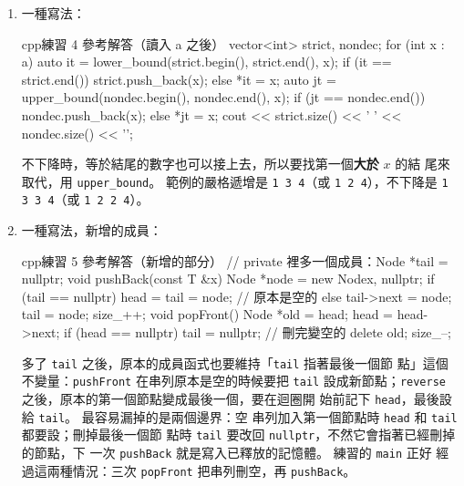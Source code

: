 \begin{enumerate}
\begin{code}{cpp}{練習 3 參考解答}
int main() {
    int n, cap;
    cin >> n >> cap;
    vector<long long> dp(cap + 1, 0);
    for (int i = 0; i < n; i++) {
        int w;
        long long v;
        cin >> w >> v;
        for (int j = cap; j >= w; j--) {   // 由大到小
            dp[j] = max(dp[j], dp[j - w] + v);
        }
    }
    cout << dp[cap] << '\n';
    return 0;
}
\end{code}
處理第 $i$ 件物品時，\texttt{dp[j]} 有兩種選擇：不拿，維持原值；拿，就是
\texttt{dp[j - w] + v}。 \texttt{j} 一定要由大到小：這樣讀到的
\texttt{dp[j - w]} 還是「沒考慮第 $i$ 件」時的值，每件只會被拿一次。 寫成
由小到大，\texttt{dp[j - w]} 可能已經拿過這件物品，同一件會被拿好幾次，範
例會輸出 \texttt{10}（重量 $2$ 的物品拿兩次再加重量 $3$ 的）。 時間是
$O(nW) = 10^7$。
\item 一種寫法：
\begin{code}{cpp}{練習 4 參考解答（讀入 a 之後）}
vector<int> strict, nondec;
for (int x : a) {
    auto it = lower_bound(strict.begin(), strict.end(), x);
    if (it == strict.end()) {
        strict.push_back(x);
    } else {
        *it = x;
    }
    auto jt = upper_bound(nondec.begin(), nondec.end(), x);
    if (jt == nondec.end()) {
        nondec.push_back(x);
    } else {
        *jt = x;
    }
}
cout << strict.size() << ' ' << nondec.size() << '\n';
\end{code}
不下降時，等於結尾的數字也可以接上去，所以要找第一個\textbf{大於} $x$ 的結
尾來取代，用 \texttt{upper\_bound}。 範例的嚴格遞增是 \texttt{1 3 4}（或
\texttt{1 2 4}），不下降是 \texttt{1 3 3 4}（或 \texttt{1 2 2 4}）。
\item 一種寫法，新增的成員：
\begin{code}{cpp}{練習 5 參考解答（新增的部分）}
// private 裡多一個成員：Node *tail = nullptr;
void pushBack(const T &x) {
    Node *node = new Node{x, nullptr};
    if (tail == nullptr) {
        head = tail = node;            // 原本是空的
    } else {
        tail->next = node;
        tail = node;
    }
    size_++;
}
void popFront() {
    Node *old = head;
    head = head->next;
    if (head == nullptr) {
        tail = nullptr;                // 刪完變空的
    }
    delete old;
    size_--;
}
\end{code}
多了 \texttt{tail} 之後，原本的成員函式也要維持「\texttt{tail} 指著最後一個節
點」這個不變量：\texttt{pushFront} 在串列原本是空的時候要把 \texttt{tail}
設成新節點；\texttt{reverse} 之後，原本的第一個節點變成最後一個，要在迴圈開
始前記下 \texttt{head}，最後設給 \texttt{tail}。 最容易漏掉的是兩個邊界：空
串列加入第一個節點時 \texttt{head} 和 \texttt{tail} 都要設；刪掉最後一個節
點時 \texttt{tail} 要改回 \texttt{nullptr}，不然它會指著已經刪掉的節點，下
一次 \texttt{pushBack} 就是寫入已釋放的記憶體。 練習的 \texttt{main} 正好
經過這兩種情況：三次 \texttt{popFront} 把串列刪空，再 \texttt{pushBack}。
\end{enumerate}

